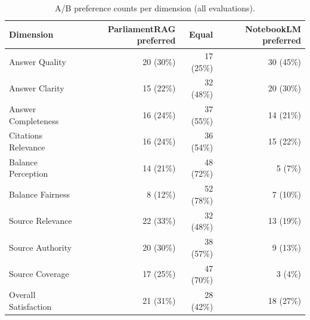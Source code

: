\begin{table}[htbp]
\centering
\caption{A/B preference counts per dimension (all evaluations).}
\label{tab:preferences}
\small
\begin{tabular}{lrrr}
\toprule
Dimension & ParliamentRAG preferred & Equal & NotebookLM preferred \\
\midrule
Answer Quality & 20 (30\%) & 17 (25\%) & 30 (45\%) \\
Answer Clarity & 15 (22\%) & 32 (48\%) & 20 (30\%) \\
Answer Completeness & 16 (24\%) & 37 (55\%) & 14 (21\%) \\
Citations Relevance & 16 (24\%) & 36 (54\%) & 15 (22\%) \\
Balance Perception & 14 (21\%) & 48 (72\%) & 5 (7\%) \\
Balance Fairness & 8 (12\%) & 52 (78\%) & 7 (10\%) \\
Source Relevance & 22 (33\%) & 32 (48\%) & 13 (19\%) \\
Source Authority & 20 (30\%) & 38 (57\%) & 9 (13\%) \\
Source Coverage & 17 (25\%) & 47 (70\%) & 3 (4\%) \\
Overall Satisfaction & 21 (31\%) & 28 (42\%) & 18 (27\%) \\
\bottomrule
\end{tabular}
\end{table}